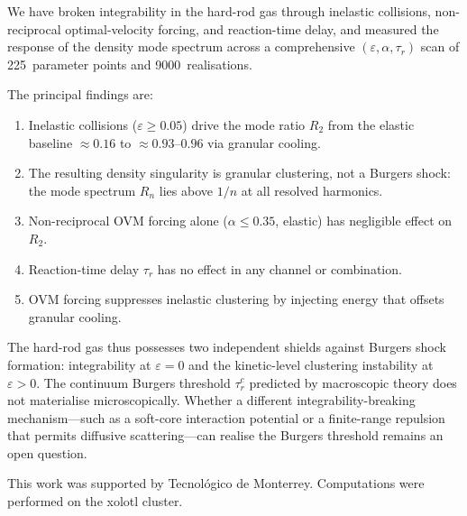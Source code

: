 \documentclass[aps,pre,twocolumn,superscriptaddress,longbibliography,floatfix]{revtex4-2}
\begin{document}
We have broken integrability in the hard-rod gas through
inelastic collisions, non-reciprocal optimal-velocity forcing,
and reaction-time delay, and measured the response of the density
mode spectrum across a comprehensive $(\varepsilon, \alpha,
\tau_r)$ scan of 225~parameter points and 9000~realisations.

The principal findings are:
\begin{enumerate}
\item Inelastic collisions ($\varepsilon \geq 0.05$) drive the
mode ratio $R_2$ from the elastic baseline $\approx 0.16$ to
$\approx 0.93$--$0.96$ via granular cooling.
\item The resulting density singularity is granular clustering, not
a Burgers shock: the mode spectrum $R_n$ lies above $1/n$ at all
resolved harmonics.
\item Non-reciprocal OVM forcing alone ($\alpha \leq 0.35$,
elastic) has negligible effect on $R_2$.
\item Reaction-time delay $\tau_r$ has no effect in any channel or
combination.
\item OVM forcing suppresses inelastic clustering by injecting
energy that offsets granular cooling.
\end{enumerate}

The hard-rod gas thus possesses two independent shields against
Burgers shock formation: integrability at $\varepsilon = 0$ and
the kinetic-level clustering instability at $\varepsilon > 0$.
The continuum Burgers threshold $\tau_r^c$ predicted by
macroscopic theory does not materialise microscopically. Whether a
different integrability-breaking mechanism---such as a soft-core
interaction potential or a finite-range repulsion that permits
diffusive scattering---can realise the Burgers threshold remains
an open question.

\begin{acknowledgments}
This work was supported by Tecnol\'ogico de Monterrey.
Computations were performed on the xolotl cluster.
\end{acknowledgments}
\end{document}
